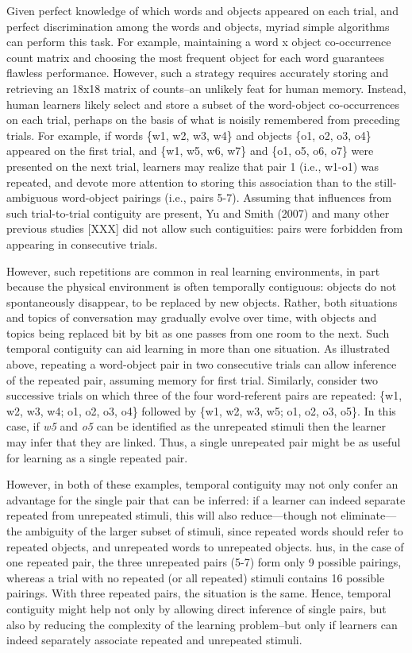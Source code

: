 \documentclass[man,floatsintext]{apa6}
\begin{document}
Given perfect knowledge of which words and objects appeared on each trial, and perfect discrimination among the words and objects, myriad simple algorithms can perform this task.
For example, maintaining a word x object co-occurrence count matrix and choosing the most frequent object for each word guarantees flawless performance.
However, such a strategy requires accurately storing and retrieving an 18x18 matrix of counts--an unlikely feat for human memory.
Instead, human learners likely select and store a subset of the word-object co-occurrences on each trial, perhaps on the basis of what is noisily remembered from preceding trials.
For example, if words \{w1, w2, w3, w4\} and objects \{o1, o2, o3, o4\} appeared on the first trial, and \{w1, w5, w6, w7\} and \{o1, o5, o6, o7\} were presented on the next trial, learners may realize that pair 1 (i.e., w1-o1) was repeated, and devote more attention to storing this association than to the still-ambiguous word-object pairings (i.e., pairs 5-7).
Assuming that influences from such trial-to-trial contiguity are present, Yu and Smith (2007) and many other previous studies {[}XXX{]} did not allow such contiguities: pairs were forbidden from appearing in consecutive trials.

However, such repetitions are common in real learning environments, in part because the physical environment is often temporally contiguous: objects do not spontaneously disappear, to be replaced by new objects.
Rather, both situations and topics of conversation may gradually evolve over time, with objects and topics being replaced bit by bit as one passes from one room to the next.
Such temporal contiguity can aid learning in more than one situation.
As illustrated above, repeating a word-object pair in two consecutive trials can allow inference of the repeated pair, assuming memory for first trial.
Similarly, consider two successive trials on which three of the four word-referent pairs are repeated: \{w1, w2, w3, w4; o1, o2, o3, o4\} followed by \{w1, w2, w3, w5; o1, o2, o3, o5\}.
In this case, if \emph{w5} and \emph{o5} can be identified as the unrepeated stimuli then the learner may infer that they are linked.
Thus, a single unrepeated pair might be as useful for learning as a single repeated pair.

However, in both of these examples, temporal contiguity may not only confer an advantage for the single pair that can be inferred: if a learner can indeed separate repeated from unrepeated stimuli, this will also reduce---though not eliminate---the ambiguity of the larger subset of stimuli, since repeated words should refer to repeated objects, and unrepeated words to unrepeated objects.
hus, in the case of one repeated pair, the three unrepeated pairs (5-7) form only 9 possible pairings, whereas a trial with no repeated (or all repeated) stimuli contains 16 possible pairings.
With three repeated pairs, the situation is the same.
Hence, temporal contiguity might help not only by allowing direct inference of single pairs, but also by reducing the complexity of the learning problem--but only if learners can indeed separately associate repeated and unrepeated stimuli.
\end{document}
